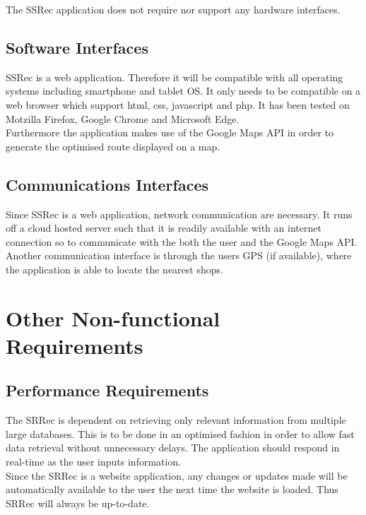 \documentclass[10pt, a4paper, twocolumn]{scrartcl}
\begin{document}
			The SSRec application does not require nor support any hardware interfaces.
	
		\subsection{Software Interfaces}
	
			SSRec is a web application. Therefore it will be compatible with all operating systems including smartphone and tablet OS. It only needs to be compatible on a web browser which support html, css, javascript and php. It has been tested on Motzilla Firefox, Google Chrome and Microsoft Edge.\\
	
			Furthermore the application makes use of the Google Maps API in order to generate the optimised route displayed on a map.
	
		\subsection{Communications Interfaces}
	
			Since SSRec is a web application, network communication are necessary. It runs off a cloud hosted server such that it is readily available with an internet connection so to communicate with the both the user and the Google Maps API. Another communication interface is through the users GPS (if available), where the application is able to locate the nearest shops.
	
	\section{Other Non-functional Requirements}
	
		\subsection{Performance Requirements}
	
			The SRRec is dependent on retrieving only relevant information from multiple large databases. This is to be done in an optimised fashion in order to allow fast data retrieval without unnecessary delays. The application should respond in real-time as the user inputs information.\\
	
			Since the SRRec is a website application, any changes or updates made will be automatically available to the user the next time the website is loaded. Thus SRRec will always be up-to-date.\\
	
\end{document}

